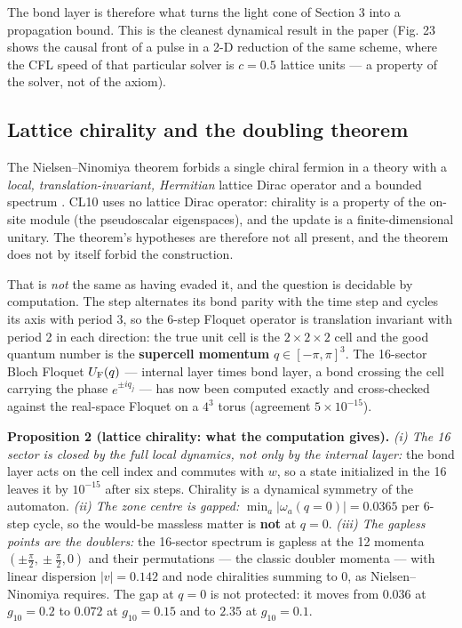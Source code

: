 \documentclass[aps,prd,amsmath,amssymb,superscriptaddress,longbibliography,floatfix,preprint]{revtex4-2}
\begin{document}
The bond layer is therefore what turns the light cone of Section 3 into a propagation bound. This is the cleanest dynamical result in the paper (Fig. 23 shows the causal front of a pulse in a 2-D reduction of the same scheme, where the CFL speed of that particular solver is $c = 0.5$ lattice units --- a property of the solver, not of the axiom).

\subsection{Lattice chirality and the doubling theorem}

The Nielsen--Ninomiya theorem forbids a single chiral fermion in a theory with a \emph{local, translation-invariant, Hermitian} lattice Dirac operator and a bounded spectrum \cite{ref19}. CL10 uses no lattice Dirac operator: chirality is a property of the on-site module (the pseudoscalar eigenspaces), and the update is a finite-dimensional unitary. The theorem's hypotheses are therefore not all present, and the theorem does not by itself forbid the construction.

That is \emph{not} the same as having evaded it, and the question is decidable by computation. The step alternates its bond parity with the time step and cycles its axis with period 3, so the 6-step Floquet operator is translation invariant with period 2 in each direction: the true unit cell is the $2\times2\times2$ cell and the good quantum number is the \textbf{supercell momentum} $q \in [-\pi,\allowbreak{}\pi]^3$. The 16-sector Bloch Floquet $U_{\rm F}(q)$ --- internal layer times bond layer, a bond crossing the cell carrying the phase $e^{\pm i q_j}$ --- has now been computed exactly and cross-checked against the real-space Floquet on a $4^3$ torus (agreement $5\times10^{-15}$).

\textbf{Proposition 2 (lattice chirality: what the computation gives).} \emph{(i) The 16 sector is closed by the full local dynamics, not only by the internal layer:} the bond layer acts on the cell index and commutes with $w$, so a state initialized in the 16 leaves it by $10^{-15}$ after six steps. Chirality is a dynamical symmetry of the automaton. \emph{(ii) The zone centre is gapped:} $\min_a|\omega_a(q=0)| = 0.0365$ per 6-step cycle, so the would-be massless matter is \textbf{not} at $q = 0$. \emph{(iii) The gapless points are the doublers:} the 16-sector spectrum is gapless at the 12 momenta $(\pm\tfrac\pi2,\allowbreak{}\pm\tfrac\pi2,\allowbreak{}0)$ and their permutations --- the classic doubler momenta --- with linear dispersion $|v| = 0.142$ and node chiralities summing to $0$, as Nielsen--Ninomiya requires. The gap at $q = 0$ is not protected: it moves from $0.036$ at $g_{10} = 0.2$ to $0.072$ at $g_{10} = 0.15$ and to $2.35$ at $g_{10} = 0.1$.
\end{document}
